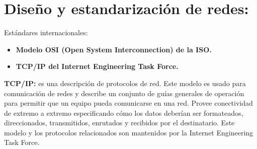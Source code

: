 \documentclass[a4paper,11pt]{article}
\begin{document}
\section{Diseño y estandarización de redes:}
Estándares internacionales:

\begin{itemize}
\item \textbf{Modelo OSI (Open System Interconnection) de la ISO.}
\item \textbf{TCP/IP del Internet Engineering Task Force.}
\end{itemize}

\textbf{TCP/IP:} es una descripción de protocolos de red. Este modelo es usado para comunicación de redes y describe un conjunto de guías generales de operación para permitir que un equipo pueda comunicarse en una red. Provee conectividad de extremo a extremo especificando cómo los datos deberían ser formateados, direccionados, transmitidos, enrutados y recibidos por el destinatario. Este modelo y los protocolos relacionados son mantenidos por la Internet Engineering Task Force. \\
\end{document}
